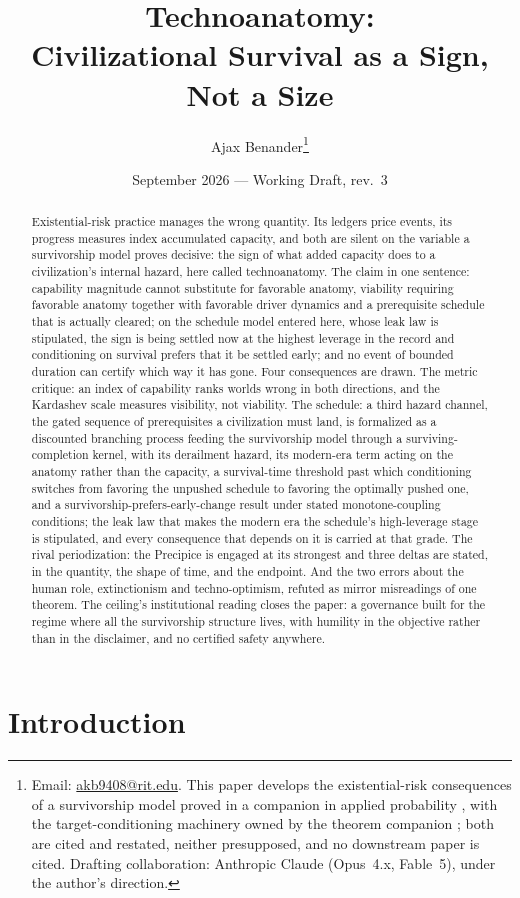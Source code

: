\documentclass[11pt]{article}
\title{Technoanatomy:\\ \large Civilizational Survival as a Sign, Not a Size}
\author{Ajax Benander\thanks{Email:
\href{mailto:akb9408@rit.edu}{akb9408@rit.edu}. This paper develops the
existential-risk consequences of a survivorship model proved in a companion in
applied probability \cite{SurvA}, with the target-conditioning
machinery owned by the theorem companion \cite{TargetedB1}; both are
cited and restated, neither presupposed, and no downstream paper is
cited. Drafting
collaboration: Anthropic Claude (Opus~4.x, Fable~5), under the author's
direction.}}
\date{September 2026 --- Working Draft, rev.~3}
\theoremstyle{plain}
\theoremstyle{definition}
\theoremstyle{remark}
\begin{document}
\maketitle

\begin{abstract}
Existential-risk practice manages the wrong quantity. Its ledgers price
events, its progress measures index accumulated capacity, and both are
silent on the variable a survivorship model proves decisive: the sign of
what added capacity does to a civilization's internal hazard, here called
technoanatomy. The claim in one sentence: capability magnitude cannot substitute for
favorable anatomy, viability requiring favorable anatomy together with
favorable driver dynamics and a prerequisite schedule that is actually
cleared; on the schedule model entered here, whose leak law is
stipulated, the sign is being settled now at the highest leverage in the
record and conditioning on survival prefers that it be settled early;
and no event of bounded duration can certify which way it has gone. Four consequences
are drawn. The metric critique: an index of capability ranks worlds wrong
in both directions, and the Kardashev scale measures visibility, not
viability. The schedule: a third hazard channel, the gated sequence of
prerequisites a civilization must land, is formalized as a discounted
branching process feeding the survivorship model through a
surviving-completion kernel, with its derailment hazard, its modern-era
term acting on the anatomy rather than the capacity, a survival-time
threshold past which conditioning switches from favoring the unpushed
schedule to favoring the optimally pushed one, and a
survivorship-prefers-early-change result under stated monotone-coupling
conditions; the leak law that makes the modern era the schedule's
high-leverage stage is stipulated, and every consequence that depends on
it is carried at that grade.
The rival periodization: the Precipice is engaged at its strongest and
three deltas are stated, in the quantity, the shape of time, and the
endpoint. And the two errors about the human role, extinctionism and
techno-optimism, refuted as mirror misreadings of one theorem. The
ceiling's institutional reading closes the paper: a governance built for
the regime where all the survivorship structure lives, with humility in
the objective rather than in the disclaimer, and no certified safety
anywhere.
\end{abstract}

\section{Introduction}\label{sec:intro}
\end{document}
